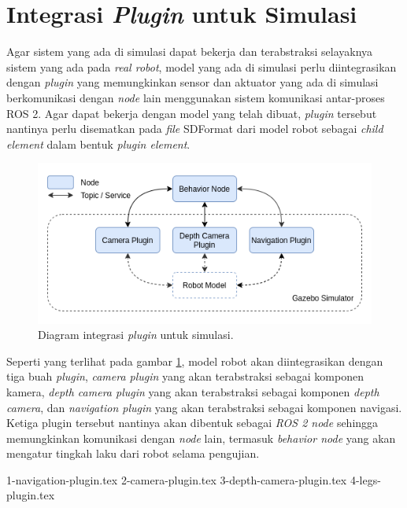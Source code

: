 \section{Integrasi \emph{Plugin} untuk Simulasi}
\label{sec:integrasiplugin}

Agar sistem yang ada di simulasi dapat bekerja dan terabstraksi selayaknya sistem yang ada pada \emph{real robot},
  model yang ada di simulasi perlu diintegrasikan dengan \emph{plugin} yang memungkinkan sensor dan aktuator yang ada di simulasi berkomunikasi dengan \emph{node} lain menggunakan sistem komunikasi antar-proses ROS 2.
  Agar dapat bekerja dengan model yang telah dibuat, \emph{plugin} tersebut nantinya perlu disematkan pada \emph{file} SDFormat dari model robot sebagai \emph{child element} dalam bentuk \emph{plugin element}.

\begin{figure}[ht]
  \centering
  \includegraphics[scale=0.5]{gambar/integrasi-plugin-simulasi.png}
  \caption{Diagram integrasi \emph{plugin} untuk simulasi.}
  \label{fig:integrasipluginsimulasi}
\end{figure}

Seperti yang terlihat pada gambar \ref{fig:integrasipluginsimulasi},
  model robot akan diintegrasikan dengan tiga buah \emph{plugin},
  \emph{camera plugin} yang akan terabstraksi sebagai komponen kamera,
  \emph{depth camera plugin} yang akan terabstraksi sebagai komponen \emph{depth camera},
  dan \emph{navigation plugin} yang akan terabstraksi sebagai komponen navigasi.
Ketiga plugin tersebut nantinya akan dibentuk sebagai \emph{ROS 2 node} sehingga memungkinkan komunikasi dengan \emph{node} lain,
  termasuk \emph{behavior node} yang akan mengatur tingkah laku dari robot selama pengujian.

{1-navigation-plugin.tex}
{2-camera-plugin.tex}
{3-depth-camera-plugin.tex}
{4-legs-plugin.tex}
